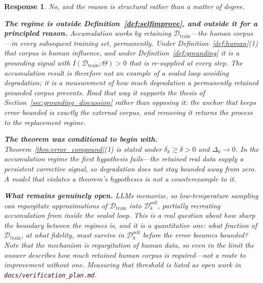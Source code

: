 \documentclass[11pt,a4paper]{article}
\newtheorem{response}{Response}
\begin{document}
\begin{response}
No, and the reason is structural rather than a matter of degree.

\textbf{The regime is outside Definition~\ref{def:selfimprove}, and outside it for a principled reason.} Accumulation works by retaining $\mathcal{D}_{\mathrm{train}}$---the human corpus---in every subsequent training set, permanently. Under Definition~\ref{def:human}(1) that corpus is human influence, and under Definition~\ref{def:grounding} it is a grounding signal with $I(\mathcal{D}_{\mathrm{train}};\Theta) > 0$ that is re-supplied at every step. The accumulation result is therefore not an example of a sealed loop avoiding degradation; it is a measurement of how much degradation a permanently retained grounded corpus prevents. Read that way it \emph{supports} the thesis of Section~\ref{sec:grounding_discussion} rather than opposing it: the anchor that keeps error bounded is exactly the external corpus, and removing it returns the process to the replacement regime.

\textbf{The theorem was conditional to begin with.} Theorem~\ref{thm:error_compound}(1) is stated under $\delta_k \geq \delta > 0$ and $\Delta_k \to 0$. In the accumulation regime the first hypothesis fails---the retained real data supply a persistent corrective signal, so degradation does not stay bounded away from zero. A model that violates a theorem's hypotheses is not a counterexample to it.

\textbf{What remains genuinely open.} LLMs memorize, so low-temperature sampling can regurgitate approximations of $\mathcal{D}_{\mathrm{train}}$ into $\mathcal{D}_k^{\mathrm{self}}$, partially recreating accumulation from inside the sealed loop. This is a real question about how sharp the boundary between the regimes is, and it is a quantitative one: what fraction of $\mathcal{D}_{\mathrm{train}}$, at what fidelity, must survive in $\mathcal{D}_k^{\mathrm{self}}$ before the error becomes bounded? Note that the mechanism is regurgitation of \emph{human} data, so even in the limit the answer describes how much retained human corpus is required---not a route to improvement without one. Measuring that threshold is listed as open work in \texttt{docs/\allowbreak verification\_\allowbreak plan.md}.
\end{response}
\end{document}
